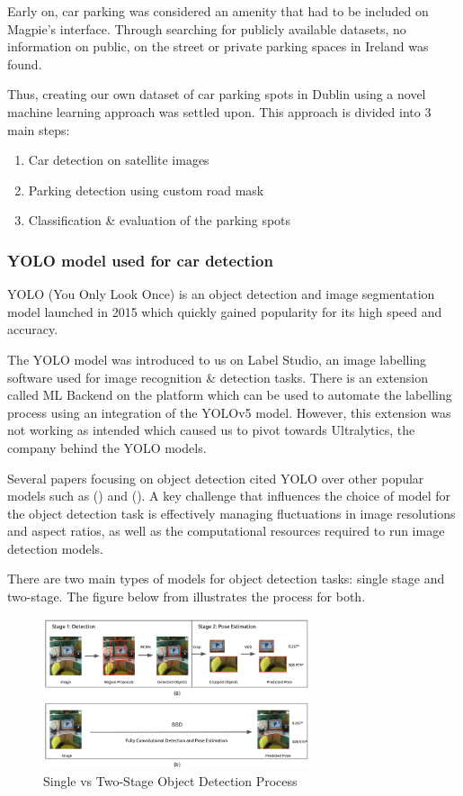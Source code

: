 Early on, car parking was considered an amenity that had to be included on
Magpie's interface. Through searching for publicly available datasets, 
no information on public, on the street or private parking
spaces in Ireland was found.

Thus, creating our own dataset of car parking spots in Dublin
using a novel machine learning approach was settled upon.
This approach is divided into 3 main steps:
\begin{enumerate}
  \item Car detection on satellite images
  \item Parking detection using custom road mask
  \item Classification \& evaluation of the parking spots
\end{enumerate}

\subsubsection{YOLO model used for car detection}
YOLO (You Only Look Once) is an object detection and image segmentation model
launched in 2015 which quickly gained popularity for its high speed and
accuracy.

The YOLO model was introduced to us on Label Studio, an image labelling software used for
image recognition \& detection tasks. There is an extension called ML Backend on
the platform which can be used to automate the labelling process using an
integration of the YOLOv5 model. However, this extension was not working as
intended which caused us to pivot towards Ultralytics, the company behind the
YOLO models.

Several papers focusing on object detection cited YOLO over other popular models
such as (\cite{firedetectionYOLO}) and (\cite{polypdetectionYOLO}). A key
challenge that influences the choice of model for the object detection task is
effectively managing fluctuations in image resolutions and aspect ratios, as
well as the computational resources required to run image detection models.

There are two main types of models for object detection tasks: single stage and
two-stage. The figure below from \cite{singlevstwodetectorimg} illustrates the
process for both.

\begin{figure}[htbp]
  \centering
  \includegraphics[width=0.7\textwidth]{images/single-vs-two-stage-obj-detector.png}
  \caption{Single vs Two-Stage Object Detection Process}
\end{figure}

